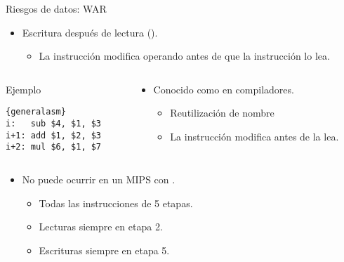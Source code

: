 \begin{frame}[t,fragile]{Riesgos de datos: WAR}
\begin{itemize}
  \item Escritura después de lectura ().
    \begin{itemize}
      \item La instrucción  modifica operando antes de que la
            instrucción  lo lea.
    \end{itemize}
\end{itemize}
\begin{columns}
\begin{column}{.25\textwidth}
\begin{block}{Ejemplo}
\begin{lstlisting}{generalasm}
i:   sub $4, $1, $3
i+1: add $1, $2, $3
i+2: mul $6, $1, $7
\end{lstlisting}
\end{block}
\end{column}
\begin{column}{.75\textwidth}
\begin{itemize}
  \item Conocido como  en compiladores.
    \begin{itemize}
      \item Reutilización de nombre
      \item La instrucción  modifica 
            antes de  la lea.
    \end{itemize}
\end{itemize}
\end{column}
\end{columns}
\begin{itemize}
  \item \alert{No puede} ocurrir en un MIPS con .
  \begin{itemize}
    \item Todas las instrucciones de 5 etapas.
    \item Lecturas siempre en etapa 2.
    \item Escrituras siempre en etapa 5.
  \end{itemize}
\end{itemize}
\end{frame}

